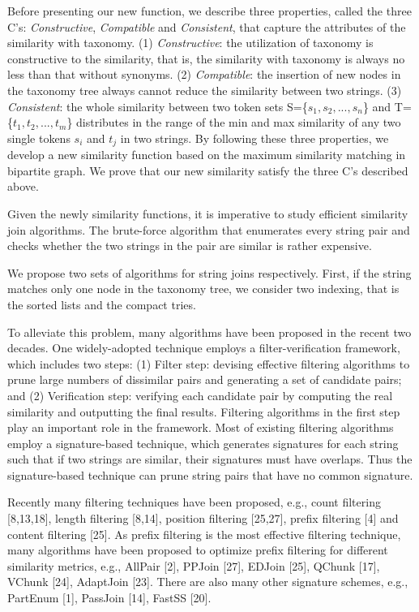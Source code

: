  Before presenting our new function, we describe three properties, called the three C's:  \textit{Constructive}, \textit{Compatible} and \textit{Consistent},  that capture the attributes of the similarity with taxonomy. (1) \textit{Constructive}: the utilization of taxonomy is constructive to the similarity, that is, the similarity with taxonomy is always no less than that without synonyms. (2) \textit{Compatible}:  the insertion of new nodes in the taxonomy tree always cannot reduce the similarity between two strings. (3) \textit{Consistent}:  the whole similarity between two token sets S=\{$s_1,s_2,...,s_n$\} and T=\{$t_1,t_2,...,t_m$\} distributes in the range of the min and max similarity of any two single tokens $s_i$ and $t_j$ in two strings. By following these three properties, we develop a new similarity function based on the maximum similarity matching in bipartite graph. We prove that our new similarity satisfy the three C's described above.



Given the newly similarity functions, it is imperative to study efficient similarity join algorithms. The brute-force algorithm that enumerates every string pair and checks whether the two strings in the pair are similar is rather expensive.


We propose two sets of algorithms for string joins respectively. First, if the string matches only one node in the taxonomy tree, we consider two indexing, that is the sorted lists and the compact tries.

To alleviate this problem, many algorithms have been proposed in the recent two decades. One widely-adopted technique employs a filter-verification framework, which includes two steps: (1) Filter step: devising effective filtering algorithms to prune large numbers of dissimilar pairs and generating a set of candidate pairs; and (2) Verification step: verifying each candidate pair by computing
the real similarity and outputting the final results. Filtering algorithms in the first step play an important role
in the framework. Most of existing filtering algorithms employ a signature-based technique, which generates signatures for each string such that if two strings are similar, their signatures must have overlaps. Thus the signature-based technique can prune string pairs that have no common signature.

Recently many filtering techniques have been proposed, e.g., count filtering [8,13,18], length filtering [8,14], position
filtering [25,27], prefix filtering [4] and content filtering [25]. As prefix filtering is the most effective filtering technique,
many algorithms have been proposed to optimize prefix filtering for different similarity metrics, e.g., AllPair [2],
PPJoin [27], EDJoin [25], QChunk [17], VChunk [24], AdaptJoin [23]. There are also many other signature schemes, e.g., PartEnum [1],
PassJoin [14], FastSS [20].

